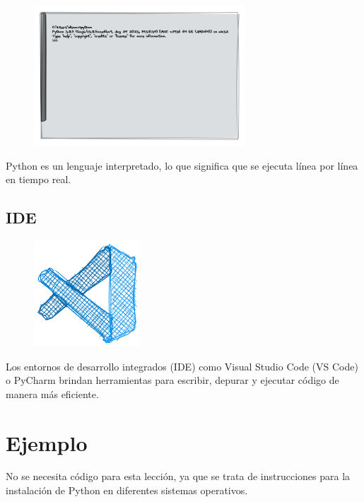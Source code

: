 \documentclass[
  a4paper,
  DIV=11,
  numbers=noendperiod,
  onepage,
  openany]{scrreprt}
\begin{document}
\begin{figure}

{\centering \includegraphics{unidades/unidad1/images/interprete.png}

}

\end{figure}

Python es un lenguaje interpretado, lo que significa que se ejecuta
línea por línea en tiempo real.

\subsection{IDE}\label{ide}

\begin{figure}

{\centering \includegraphics[width=1.5625in,height=\textheight]{unidades/unidad1/images/vscode.png}

}

\end{figure}

Los entornos de desarrollo integrados (IDE) como Visual Studio Code (VS
Code) o PyCharm brindan herramientas para escribir, depurar y ejecutar
código de manera más eficiente.

\section{Ejemplo}\label{ejemplo-1}

No se necesita código para esta lección, ya que se trata de
instrucciones para la instalación de Python en diferentes sistemas
operativos.
\end{document}
